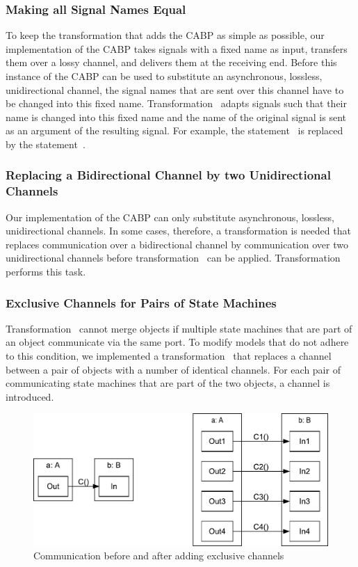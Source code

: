 \subsubsection{Making all Signal Names Equal}
\label{subsubsec:slco:endogenous:arg}
To keep the transformation that adds the CABP as simple as possible, our implementation of the CABP takes signals with a fixed name as input, transfers them over a lossy channel, and delivers them at the receiving end.
Before this instance of the CABP can be used to substitute an asynchronous, lossless, unidirectional channel, the signal names that are sent over this channel have to be changed into this fixed name.
Transformation~ adapts signals such that their name is changed into this fixed name and the name of the original signal is sent as an argument of the resulting signal.
For example, the statement~ is replaced by the statement~.

\subsubsection{Replacing a Bidirectional Channel by two Unidirectional Channels}
Our implementation of the CABP can only substitute asynchronous, lossless, unidirectional channels.
In some cases, therefore, a transformation is needed that replaces communication over a bidirectional channel by communication over two unidirectional channels before transformation~ can be applied.
Transformation~ performs this task.

\subsubsection{Exclusive Channels for Pairs of State Machines}
\label{subsubsec:slco:endogenous:ex}
Transformation~ cannot merge objects if multiple state machines that are part of an object communicate via the same port.
To modify models that do not adhere to this condition, we implemented a transformation~ that replaces a channel between a pair of objects with a number of identical channels.
For each pair of communicating state machines that are part of the two objects, a channel is introduced.

\begin{figure}[hbt]
  \centering
  \includegraphics[scale=0.45]{slco/figs/transformations/ExclusiveChannels_Communication}
  \caption{Communication before and after adding exclusive channels}
  \label{fig:slco:excomm}
\end{figure}

